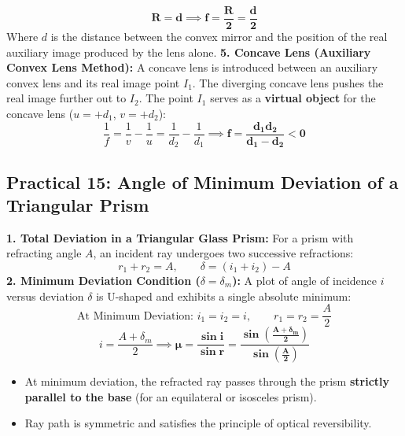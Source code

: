 \documentclass[10pt,twoside,openright]{book}
\begin{document}
\begin{conceptbox}
\begin{equation}
  \mathbf{R = d} \implies \mathbf{f = \frac{R}{2} = \frac{d}{2}}
\end{equation}
Where $d$ is the distance between the convex mirror and the position of the real auxiliary image produced by the lens alone.
\textbf{5. Concave Lens (Auxiliary Convex Lens Method):}
A concave lens is introduced between an auxiliary convex lens and its real image point $I_1$. The diverging concave lens pushes the real image further out to $I_2$. The point $I_1$ serves as a \textbf{virtual object} for the concave lens ($u = +d_1$, $v = +d_2$):
\begin{equation}
  \frac{1}{f} = \frac{1}{v} - \frac{1}{u} = \frac{1}{d_2} - \frac{1}{d_1} \implies \mathbf{f = \frac{d_1 d_2}{d_1 - d_2} < 0}
\end{equation}
\end{conceptbox}

\subsection{Practical 15: Angle of Minimum Deviation of a Triangular Prism}

\begin{formulabox}
\textbf{1. Total Deviation in a Triangular Glass Prism:}
For a prism with refracting angle $A$, an incident ray undergoes two successive refractions:
\begin{equation}
  r_1 + r_2 = A, \qquad \delta = (i_1 + i_2) - A
\end{equation}
\textbf{2. Minimum Deviation Condition ($\delta = \delta_m$):}
A plot of angle of incidence $i$ versus deviation $\delta$ is U-shaped and exhibits a single absolute minimum:
\begin{equation}
  \text{At Minimum Deviation: } i_1 = i_2 = i, \qquad r_1 = r_2 = \frac{A}{2}
\end{equation}
\begin{equation}
  i = \frac{A + \delta_m}{2} \implies \mathbf{\mu = \frac{\sin i}{\sin r} = \frac{\sin\left(\frac{A + \delta_m}{2}\right)}{\sin\left(\frac{A}{2}\right)}}
\end{equation}
\begin{itemize}
  \item At minimum deviation, the refracted ray passes through the prism \textbf{strictly parallel to the base} (for an equilateral or isosceles prism).
  \item Ray path is symmetric and satisfies the principle of optical reversibility.
\end{itemize}
\end{formulabox}
\end{document}
